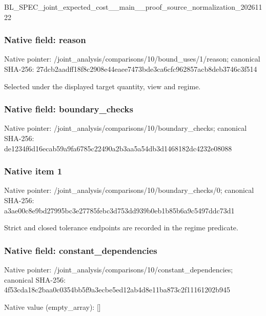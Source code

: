 \documentclass[10pt,a4paper]{article}
\begin{document}
BL\_SPEC\_joint\_expected\_c\allowbreak{}ost\_\_main\_\_proof\_source\_\allowbreak{}normalization\_20261122


\subsubsection{Native field: reason}


Native pointer: /joint\_analysis/comparis\allowbreak{}ons/10/bound\_uses/1/reas\allowbreak{}on; canonical SHA-256: 27dcb2aadff18f8c2908e44e\allowbreak{}aee7473bde3ca6cfc962857a\allowbreak{}cb8deb3746c3f514


Selected under the displayed target quantity, view and regime.


\subsubsection{Native field: boundary\_checks}


Native pointer: /joint\_analysis/comparis\allowbreak{}ons/10/boundary\_checks; canonical SHA-256: de1234f6d16ecab59a9fa678\allowbreak{}5c22490a2b3aa5a54db3d146\allowbreak{}8182dc4232e08088



\subsubsection{Native item 1}


Native pointer: /joint\_analysis/comparis\allowbreak{}ons/10/boundary\_checks/0; canonical SHA-256: a3ae00c8e9bd27995bc3e277\allowbreak{}85febc3d753dd939b0eb1b85\allowbreak{}b6a9c5497ddc73d1


Strict and closed tolerance endpoints are recorded in the regime predicate.


\subsubsection{Native field: constant\_dependencies}


Native pointer: /joint\_analysis/comparis\allowbreak{}ons/10/constant\_dependen\allowbreak{}cies; canonical SHA-256: 4f53cda18c2baa0c0354bb5f\allowbreak{}9a3ecbe5ed12ab4d8e11ba87\allowbreak{}3c2f11161202b945



Native value (empty\_array): []
\end{document}
